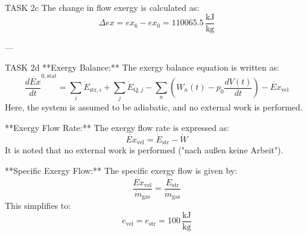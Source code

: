 TASK 2c  
The change in flow exergy is calculated as:  
\[
\Delta ex = ex_6 - ex_0 = 110065.5 \, \frac{\text{kJ}}{\text{kg}}
\]

---

TASK 2d  
**Exergy Balance:**  
The exergy balance equation is written as:  
\[
\frac{d\dot{Ex}}{dt}^{0, \text{stat}} = \sum_i \dot{E}_{\text{str},i} + \sum_j \dot{E}_{\text{Q},j} - \sum_n \left( \dot{W}_n(t) - p_0 \frac{dV(t)}{dt} \right) - \dot{Ex}_{\text{vel}}
\]  
Here, the system is assumed to be adiabatic, and no external work is performed.

**Exergy Flow Rate:**  
The exergy flow rate is expressed as:  
\[
\dot{Ex}_{\text{vel}} = \dot{E}_{\text{str}} - \dot{W}
\]  
It is noted that no external work is performed ("nach außen keine Arbeit").

**Specific Exergy Flow:**  
The specific exergy flow is given by:  
\[
\frac{\dot{Ex}_{\text{vel}}}{\dot{m}_{\text{gas}}} = \frac{\dot{E}_{\text{str}}}{\dot{m}_{\text{gas}}}
\]  
This simplifies to:  
\[
\dot{e}_{\text{vel}} = e_{\text{str}} = 100 \, \frac{\text{kJ}}{\text{kg}}
\]